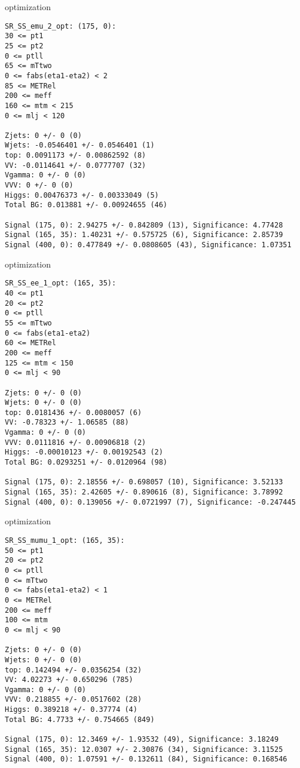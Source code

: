 \begin{frame}[fragile]{optimization}
\tiny
\begin{verbatim}
SR_SS_emu_2_opt: (175, 0):
30 <= pt1
25 <= pt2
0 <= ptll
65 <= mTtwo
0 <= fabs(eta1-eta2) < 2
85 <= METRel
200 <= meff
160 <= mtm < 215
0 <= mlj < 120

Zjets: 0 +/- 0 (0)
Wjets: -0.0546401 +/- 0.0546401 (1)
top: 0.0091173 +/- 0.00862592 (8)
VV: -0.0114641 +/- 0.0777707 (32)
Vgamma: 0 +/- 0 (0)
VVV: 0 +/- 0 (0)
Higgs: 0.00476373 +/- 0.00333049 (5)
Total BG: 0.013881 +/- 0.00924655 (46)

Signal (175, 0): 2.94275 +/- 0.842809 (13), Significance: 4.77428
Signal (165, 35): 1.40231 +/- 0.575725 (6), Significance: 2.85739
Signal (400, 0): 0.477849 +/- 0.0808605 (43), Significance: 1.07351

\end{verbatim}
\end{frame}

\begin{frame}[fragile]{optimization}
\tiny
\begin{verbatim}
SR_SS_ee_1_opt: (165, 35):
40 <= pt1
20 <= pt2
0 <= ptll
55 <= mTtwo
0 <= fabs(eta1-eta2)
60 <= METRel
200 <= meff
125 <= mtm < 150
0 <= mlj < 90

Zjets: 0 +/- 0 (0)
Wjets: 0 +/- 0 (0)
top: 0.0181436 +/- 0.0080057 (6)
VV: -0.78323 +/- 1.06585 (88)
Vgamma: 0 +/- 0 (0)
VVV: 0.0111816 +/- 0.00906818 (2)
Higgs: -0.00010123 +/- 0.00192543 (2)
Total BG: 0.0293251 +/- 0.0120964 (98)

Signal (175, 0): 2.18556 +/- 0.698057 (10), Significance: 3.52133
Signal (165, 35): 2.42605 +/- 0.890616 (8), Significance: 3.78992
Signal (400, 0): 0.139056 +/- 0.0721997 (7), Significance: -0.247445
\end{verbatim}
\end{frame}

\begin{frame}[fragile]{optimization}
\tiny
\begin{verbatim}
SR_SS_mumu_1_opt: (165, 35):
50 <= pt1
20 <= pt2
0 <= ptll
0 <= mTtwo
0 <= fabs(eta1-eta2) < 1
0 <= METRel
200 <= meff
100 <= mtm
0 <= mlj < 90

Zjets: 0 +/- 0 (0)
Wjets: 0 +/- 0 (0)
top: 0.142494 +/- 0.0356254 (32)
VV: 4.02273 +/- 0.650296 (785)
Vgamma: 0 +/- 0 (0)
VVV: 0.218855 +/- 0.0517602 (28)
Higgs: 0.389218 +/- 0.37774 (4)
Total BG: 4.7733 +/- 0.754665 (849)

Signal (175, 0): 12.3469 +/- 1.93532 (49), Significance: 3.18249
Signal (165, 35): 12.0307 +/- 2.30876 (34), Significance: 3.11525
Signal (400, 0): 1.07591 +/- 0.132611 (84), Significance: 0.168546
\end{verbatim}
\end{frame}

